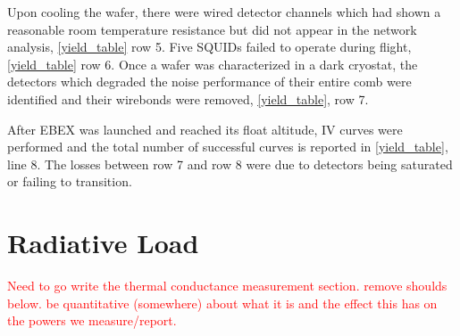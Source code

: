 Upon cooling the wafer, there were wired detector channels which had shown a reasonable room temperature resistance but did not appear in the network analysis, \TAB\ref{yield_table} row 5. 
Five \ac{SQUID}s failed to operate during flight, \TAB\ref{yield_table} row 6. 
Once a wafer was characterized in a dark cryostat, the detectors which degraded the noise performance of their entire comb were identified and their wirebonds were removed, \TAB\ref{yield_table}, row 7. 

After \ac{EBEX} was launched and reached its float altitude, IV curves were performed and the total number of successful curves is reported in \TAB\ref{yield_table}, line 8. 
The losses between row 7 and row 8 were due to detectors being saturated or failing to transition. 

%
%



\section{Radiative Load}
\label{sec:radiative_load}

\textcolor{red}{Need to go write the thermal conductance measurement section. } 
\textcolor{red}{remove shoulds below. be quantitative (somewhere) about what it is and the effect this has on the powers we measure/report.}

